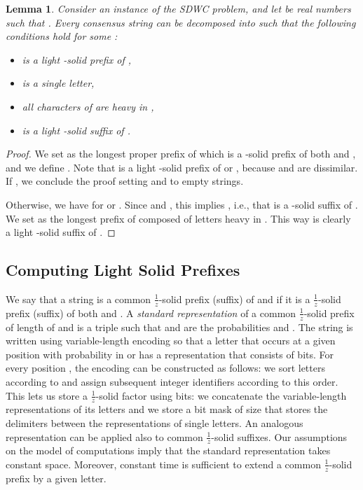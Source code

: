 \documentclass{article}
\theoremstyle{plain}
\newtheorem{lemma}[theorem]{Lemma}
\theoremstyle{definition}
\newcommand{\SDWC}{\textsc{SDWC}\xspace}
\newcommand{\fr}{\ensuremath{\frac1z}}
\begin{document}
     \begin{lemma}\label{fct:key}
     Consider an instance of the \SDWC problem,
     and let  be real numbers such that . 
      Every consensus string 
      can be decomposed into  such that the following conditions hold for some :
      \begin{itemize}
        \item  is a light -solid prefix of ,
        \item  is a single letter,
        \item all characters of  are heavy in ,
        \item  is a light -solid suffix of .
        \end{itemize}
    \end{lemma}
      \begin{proof}
        We set  as the longest proper prefix of  which is a -solid prefix of both  and ,
        and we define .  Note that  is a light -solid prefix of  or , because  and 
        are dissimilar. If , we conclude the proof setting  and  to empty strings.
        
        Otherwise, we have  for  or .
        Since  and , this implies
        , i.e., that  is a -solid suffix of .
        We set  as the longest prefix of  composed of letters heavy in .
        This way  is clearly a light -solid suffix of .
      \end{proof}
      
      
      \subsection{Computing Light Solid Prefixes}
    
    We say that a string  is a common \fr-solid prefix (suffix) of  and 
    if it is a \fr-solid prefix (suffix) of both  and .
    A \emph{standard representation} of a common \fr-solid prefix  of length  of  and  is a triple 
    such that  and  are the probabilities  and .
    The string  is written using variable-length encoding so that a letter that occurs at
    a given position with probability  in  or  has a representation that consists of  bits. For every position , the encoding can be constructed as follows: we sort letters  according to  and assign subsequent integer identifiers according to this order.
     This lets us store a \fr-solid factor using  bits: 
     we concatenate the variable-length representations of its letters and we store a bit mask of size  
     that stores the delimiters between the representations of single letters.
    An analogous representation can be applied also to common \fr-solid suffixes.
    Our assumptions on the model of computations imply that the standard representation takes constant space.
    Moreover, constant time is sufficient to extend a common \fr-solid prefix by a given letter.
\end{document}
